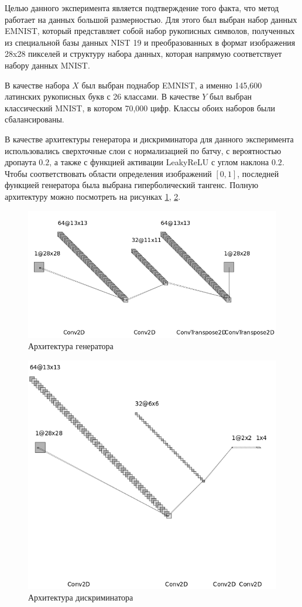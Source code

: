 Целью данного эксперимента является подтверждение того факта, что метод работает на данных большой размерностью. Для этого был выбран набор данных EMNIST, который представляет собой набор рукописных символов, полученных из специальной базы данных NIST 19 и преобразованных в формат изображения 28x28 пикселей и структуру набора данных, которая напрямую соответствует набору данных MNIST.

В качестве набора $X$ был выбран поднабор EMNIST, а именно 145,600 латинских рукописных букв с 26 классами. В качестве $Y$ был выбран классический MNIST, в котором 70,000 цифр. Классы обоих наборов были сбалансированы. 

В качестве архитектуры генератора и дискриминатора для данного эксперимента использовались сверхточные слои с нормализацией по батчу, с вероятностью дропаута $0.2$, а также с функцией активации LeakyReLU с углом наклона $0.2$. Чтобы соответствовать области определения изображений $[0, 1]$, последней функцией генератора была выбрана гиперболический тангенс. Полную архитектуру можно посмотреть на рисунках \ref{fig:gen}, \ref{fig:disc}.

\begin{figure}
    \centering
    \includegraphics[width=0.8\linewidth]{images/generator.png}
    \caption{Архитектура генератора}
    \label{fig:gen}
\end{figure}

\begin{figure}
    \centering
    \includegraphics[width=0.6\linewidth]{images/disc.png}
    \caption{Архитектура дискриминатора}
    \label{fig:disc}
\end{figure}

